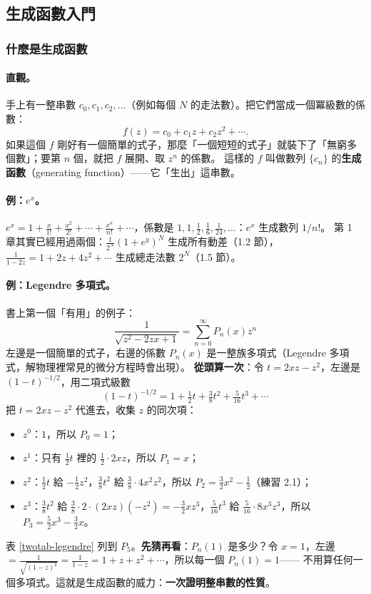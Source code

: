\subsection{生成函數入門}

\subsubsection{什麼是生成函數}

\paragraph{直觀。}
手上有一整串數 $c_0,c_1,c_2,\dots$（例如每個 $N$ 的走法數）。把它們當成一個冪級數的係數：
\[f(z)=c_0+c_1z+c_2z^2+\cdots.\]
如果這個 $f$ 剛好有一個簡單的式子，那麼「一個短短的式子」就裝下了「無窮多個數」；要第 $n$ 個，就把 $f$ 展開、取 $z^n$ 的係數。
這樣的 $f$ 叫做數列 $\{c_n\}$ 的\textbf{生成函數}（generating function）——它「生出」這串數。

\paragraph{例：$e^x$。}
$e^x=1+\frac{x}{1!}+\frac{x^2}{2!}+\cdots+\frac{x^n}{n!}+\cdots$，係數是 $1,1,\frac12,\frac16,\frac1{24},\dots$：$e^x$ 生成數列 $1/n!$。
第 1 章其實已經用過兩個：$\frac1{2^N}(1+e^y)^N$ 生成所有動差（1.2 節），$\frac1{1-2z}=1+2z+4z^2+\cdots$ 生成總走法數 $2^N$（1.5 節）。

\paragraph{例：Legendre 多項式。}
書上第一個「有用」的例子：
\[\frac{1}{\sqrt{z^2-2zx+1}}=\sum_{n=0}^{\infty}P_n(x)z^n\tag{2.1}\]
左邊是一個簡單的式子，右邊的係數 $P_n(x)$ 是一整族多項式（Legendre 多項式，解物理裡常見的微分方程時會出現）。
\textbf{從頭算一次}：令 $t=2xz-z^2$，左邊是 $(1-t)^{-1/2}$，用二項式級數
\[(1-t)^{-1/2}=1+\tfrac12t+\tfrac38t^2+\tfrac5{16}t^3+\cdots\]
把 $t=2xz-z^2$ 代進去，收集 $z$ 的同次項：
\begin{itemize}
\item $z^0$：$1$，所以 $P_0=1$；
\item $z^1$：只有 $\frac12t$ 裡的 $\frac12\cdot2xz$，所以 $P_1=x$；
\item $z^2$：$\frac12t$ 給 $-\frac12z^2$，$\frac38t^2$ 給 $\frac38\cdot4x^2z^2$，所以 $P_2=\frac32x^2-\frac12$（練習 2.1）；
\item $z^3$：$\frac38t^2$ 給 $\frac38\cdot2\cdot(2xz)(-z^2)=-\frac32xz^3$，$\frac5{16}t^3$ 給 $\frac5{16}\cdot8x^3z^3$，所以 $P_3=\frac52x^3-\frac32x$。
\end{itemize}
表 \ref{twotab-legendre} 列到 $P_5$。\textbf{先猜再看}：$P_n(1)$ 是多少？令 $x=1$，左邊 $=\frac1{\sqrt{(1-z)^2}}=\frac1{1-z}=1+z+z^2+\cdots$，所以每一個 $P_n(1)=1$——
不用算任何一個多項式。這就是生成函數的威力：\textbf{一次證明整串數的性質}。

